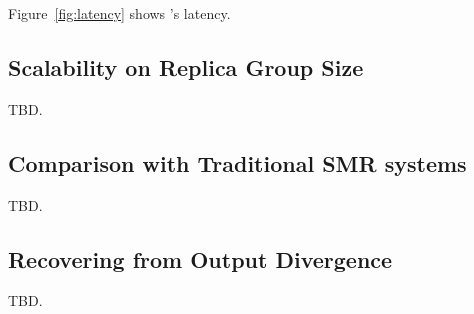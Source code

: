 Figure~\ref{fig:latency} shows \xxx's latency.

\subsection{Scalability on Replica Group Size} \label{sec:scalability}

TBD.

\subsection{Comparison with Traditional SMR systems} \label{sec:compare}

TBD.

\subsection{Recovering from Output Divergence} \label{sec:robust}

TBD.

% 



 

